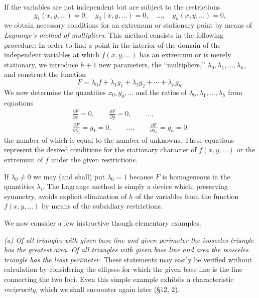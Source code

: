 If the variables are not independent but are subject to the restrictions
\[
g_1(x,y,\ldots)=0,\quad g_2(x,y,\ldots)=0,\quad\ldots,\quad g_h(x,y,\ldots)=0,
\]
we obtain necessary conditions for an extremum or stationary point by means of \emph{Lagrange's method of multipliers}. This method consists in the following procedure: In order to find a point in the interior of the domain of the independent variables at which $f(x,y,\ldots)$ has an extremum or is merely stationary, we introduce $h+1$ new parameters, the ``multipliers,'' $\lambda_0,\lambda_1,\ldots,\lambda_h$, and construct the function
\[
F=\lambda_0f+\lambda_1g_1+\lambda_2g_2+\cdots+\lambda_hg_h.
\]
We now determine the quantities $x_0,y_0,\ldots$ and the ratios of $\lambda_0,\lambda_1,\ldots,\lambda_h$ from equations
\begin{equation}\tag{1}
\begin{gathered}
\frac{\partial F}{\partial x}=0,\qquad
\frac{\partial F}{\partial y}=0,\qquad \ldots,\\[0.4em]
\frac{\partial F}{\partial\lambda_1}=g_1=0,\qquad\ldots,\qquad
\frac{\partial F}{\partial\lambda_h}=g_h=0.
\end{gathered}
\end{equation}
the number of which is equal to the number of unknowns. These equations represent the desired conditions for the stationary character of $f(x,y,\ldots)$ or the extremum of $f$ under the given restrictions.

If $\lambda_0\ne0$ we may (and shall) put $\lambda_0=1$ because $F$ is homogeneous in the quantities $\lambda_i$. The Lagrange method is simply a device which, preserving symmetry, avoids explicit elimination of $h$ of the variables from the function $f(x,y,\ldots)$ by means of the subsidiary restrictions.

We now consider a few instructive though elementary examples.

\emph{(a) Of all triangles with given base line and given perimeter the isosceles triangle has the greatest area. Of all triangles with given base line and area the isosceles triangle has the least perimeter.} These statements may easily be verified without calculation by considering the ellipses for which the given base line is the line connecting the two foci. Even this simple example exhibits a characteristic \emph{reciprocity}, which we shall encounter again later (\S12, 2).

